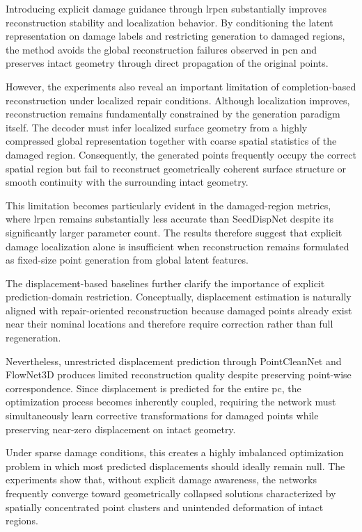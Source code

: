 Introducing explicit damage guidance through \ac{lrpcn} substantially improves reconstruction stability and localization behavior. By conditioning the latent representation on damage labels and restricting generation to damaged regions, the method avoids the global reconstruction failures observed in \ac{pcn} and preserves intact geometry through direct propagation of the original points.

However, the experiments also reveal an important limitation of completion-based reconstruction under localized repair conditions. Although localization improves, reconstruction remains fundamentally constrained by the generation paradigm itself. The decoder must infer localized surface geometry from a highly compressed global representation together with coarse spatial statistics of the damaged region. Consequently, the generated points frequently occupy the correct spatial region but fail to reconstruct geometrically coherent surface structure or smooth continuity with the surrounding intact geometry.

This limitation becomes particularly evident in the damaged-region metrics, where \ac{lrpcn} remains substantially less accurate than SeedDispNet despite its significantly larger parameter count. The results therefore suggest that explicit damage localization alone is insufficient when reconstruction remains formulated as fixed-size point generation from global latent features.

The displacement-based baselines further clarify the importance of explicit prediction-domain restriction. Conceptually, displacement estimation is naturally aligned with repair-oriented reconstruction because damaged points already exist near their nominal locations and therefore require correction rather than full regeneration.

Nevertheless, unrestricted displacement prediction through PointCleanNet and FlowNet3D produces limited reconstruction quality despite preserving point-wise correspondence. Since displacement is predicted for the entire \ac{pc}, the optimization process becomes inherently coupled, requiring the network must simultaneously learn corrective transformations for damaged points while preserving near-zero displacement on intact geometry.

Under sparse damage conditions, this creates a highly imbalanced optimization problem in which most predicted displacements should ideally remain null. The experiments show that, without explicit damage awareness, the networks frequently converge toward geometrically collapsed solutions characterized by spatially concentrated point clusters and unintended deformation of intact regions.

